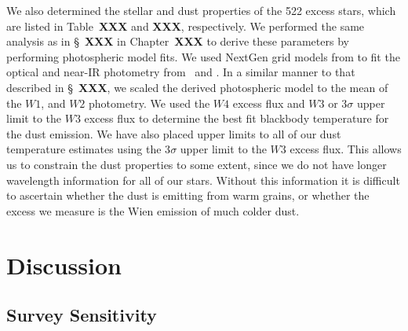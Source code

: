     We also determined the stellar and dust properties of the 522 excess stars, which are listed in Table~\textbf{XXX} and \textbf{XXX}, respectively. We performed the same analysis as in \S~\textbf{XXX} in Chapter~\textbf{XXX} to derive these parameters by performing photospheric model fits. We used NextGen grid models from \citet{Hauschildt1999} to fit the optical and near-IR photometry from \hip\ and \mass. In a similar manner to that described in \S~\textbf{XXX}, we scaled the derived photospheric model to the mean of the $W1$, and $W2$ photometry. We used the $W4$ excess flux and $W3$ or 3$\sigma$ upper limit to the $W3$ excess flux to determine the best fit blackbody temperature for the dust emission. We have also placed upper limits to all of our dust temperature estimates using the 3$\sigma$ upper limit to the $W3$ excess flux. This allows us to constrain the dust properties to some extent, since we do not have longer wavelength information for all of our stars. Without this information it is difficult to ascertain whether the dust is emitting from warm grains, or whether the excess we measure is the Wien emission of much colder dust. 
    
    

\section{Discussion}

    \subsection{Survey Sensitivity}
    
